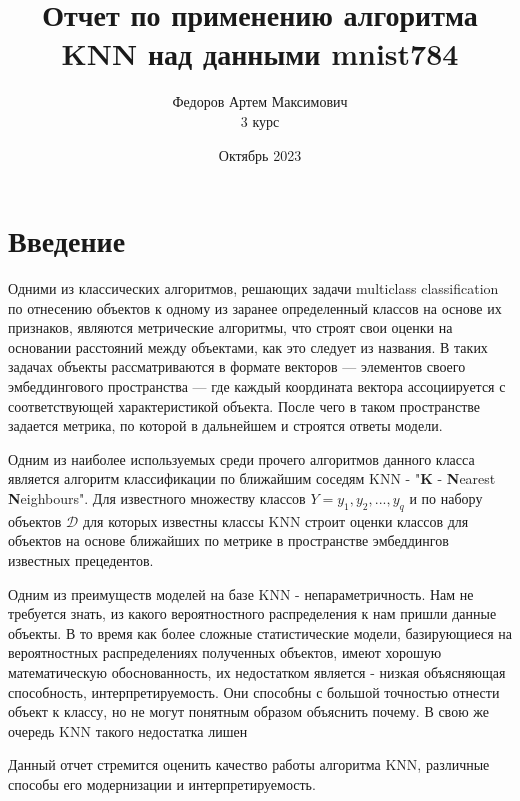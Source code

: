 \documentclass{article}
\title{Отчет по применению алгоритма KNN над данными mnist784}
\author{Федоров Артем Максимович\\3 курс}
\date{Октябрь 2023}
\begin{document}
\maketitle



\section{Введение}
    Одними из классических алгоритмов, решающих задачи multiclass classification по отнесению объектов к одному из заранее определенный классов на основе их признаков, являются метрические алгоритмы, что строят свои оценки на основании расстояний между объектами, как это следует из названия. В таких задачах объекты рассматриваются в формате векторов — элементов своего эмбеддингового пространства — где каждый координата вектора ассоциируется с соответствующей характеристикой объекта. После чего в таком пространстве задается метрика, по которой в дальнейшем и строятся ответы модели.
    
    Одним из наиболее используемых среди прочего алгоритмов данного класса является алгоритм классификации по ближайшим соседям KNN - "\textbf{K} - \textbf{N}earest \textbf{N}eighbours". Для известного множеству классов $Y = {y_1, y_2, ..., y_q}$ и по набору объектов $\mathcal{D}$ для которых известны классы KNN строит оценки классов для объектов на основе ближайших по метрике в пространстве эмбеддингов известных прецедентов. 

    \begin{leftrule}
        Одним из преимуществ моделей на базе KNN - непараметричность. Нам не требуется знать, из какого вероятностного распределения к нам пришли данные объекты. В то время как более сложные статистические модели, базирующиеся на вероятностных распределениях полученных объектов, имеют хорошую математическую обоснованность, их недостатком является - низкая объясняющая способность, интерпретируемость. Они способны с большой точностью отнести объект к классу, но не могут понятным образом объяснить почему. В свою же очередь KNN такого недостатка лишен
    \end{leftrule}

Данный отчет стремится оценить качество работы алгоритма KNN, различные способы его модернизации и интерпретируемость.
\end{document}
